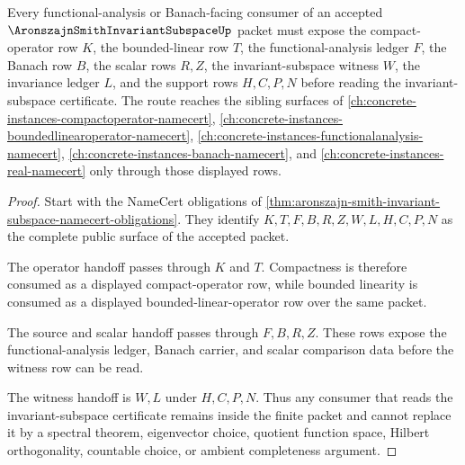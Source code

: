 \begin{theorem}
\label{thm:aronszajn-smith-invariant-subspace-compact-operator-route}
Every functional-analysis or Banach-facing consumer of an accepted $\AronszajnSmithInvariantSubspaceUp$ packet must expose the compact-operator row $K$, the bounded-linear row $T$, the functional-analysis ledger $F$, the Banach row $B$, the scalar rows $R,Z$, the invariant-subspace witness $W$, the invariance ledger $L$, and the support rows $H,C,P,N$ before reading the invariant-subspace certificate. The route reaches the sibling surfaces of \autoref{ch:concrete-instances-compactoperator-namecert}, \autoref{ch:concrete-instances-boundedlinearoperator-namecert}, \autoref{ch:concrete-instances-functionalanalysis-namecert}, \autoref{ch:concrete-instances-banach-namecert}, and \autoref{ch:concrete-instances-real-namecert} only through those displayed rows.
\end{theorem}
\begin{proof}
Start with the NameCert obligations of \autoref{thm:aronszajn-smith-invariant-subspace-namecert-obligations}. They identify $K,T,F,B,R,Z,W,L,H,C,P,N$ as the complete public surface of the accepted packet.

The operator handoff passes through $K$ and $T$. Compactness is therefore consumed as a displayed compact-operator row, while bounded linearity is consumed as a displayed bounded-linear-operator row over the same packet.

The source and scalar handoff passes through $F,B,R,Z$. These rows expose the functional-analysis ledger, Banach carrier, and scalar comparison data before the witness row can be read.

The witness handoff is $W,L$ under $H,C,P,N$. Thus any consumer that reads the invariant-subspace certificate remains inside the finite packet and cannot replace it by a spectral theorem, eigenvector choice, quotient function space, Hilbert orthogonality, countable choice, or ambient completeness argument.
\end{proof}



